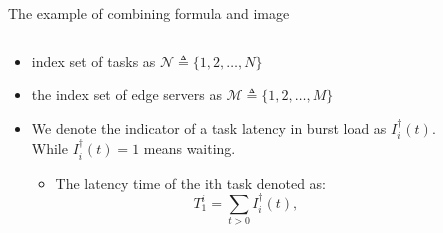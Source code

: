\documentclass{../../../Cls/SDU/Beamer/Beamer}
\begin{document}
\begin{frame}{The example of combining formula and image} %
    \begin{columns}[T] %
        \begin{column}{.65\textwidth}
            \begin{itemize}
                \item index set of tasks as $\mathcal{N} \triangleq\{1,2, \ldots, N\}$
                \item the index set of edge servers as $\mathcal{M} \triangleq\{1,2, \ldots, M\}$
                \item We denote the indicator of a task latency in burst load as $I^{\dagger }_i(t)$. While $I^{\dagger }_i(t) = 1$  means waiting.
                      \begin{itemize}
                          \item The latency time of the ith task denoted as:
                                \begin{equation*}
                                    T_1^i = \sum _{t>0} I^{\dagger }_i(t), \tag{1} %
                                \end{equation*}
                      \end{itemize}
            \end{itemize}
        \end{column}%
        \hfill%
        \begin{column}{.40\textwidth}
            \begin{figure}[thpb] %
                \centering %
\end{figure}
\end{column}
\end{columns}
\end{frame}
\end{document}
